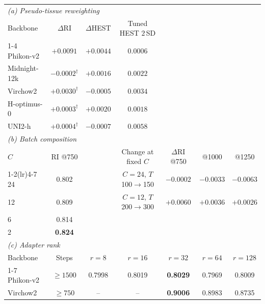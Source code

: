 \begin{tabular}{lcccccc}
\toprule
\multicolumn{7}{l}{\emph{(a) Pseudo-tissue reweighting}} \\
Backbone & $\Delta$RI & $\Delta$HEST & Tuned HEST $2$\,SD & & & \\
\cmidrule(lr){1-4}
Phikon-v2    & $+0.0091$          & $+0.0044$ & $0.0006$ & & & \\
Midnight-12k & $-0.0002^\dagger$  & $+0.0016$ & $0.0022$ & & & \\
Virchow2     & $+0.0030^\dagger$  & $-0.0005$ & $0.0034$ & & & \\
H-optimus-0  & $+0.0003^\dagger$  & $+0.0020$ & $0.0018$ & & & \\
UNI2-h       & $+0.0004^\dagger$  & $-0.0007$ & $0.0058$ & & & \\
\midrule
\multicolumn{7}{l}{\emph{(b) Batch composition}} \\
$C$ & RI @750 & & Change at fixed $C$ & $\Delta$RI @750 & @1000 & @1250 \\
\cmidrule(lr){1-2}\cmidrule(lr){4-7}
24 & 0.802          & & $C{=}24$, $T$ 100$\to$150 & $-0.0002$ & $-0.0033$ & $-0.0063$ \\
12 & 0.809          & & $C{=}12$, $T$ 200$\to$300 & $+0.0060$ & $+0.0036$ & $+0.0026$ \\
6  & 0.814          & & & & & \\
2  & \textbf{0.824} & & & & & \\
\midrule
\multicolumn{7}{l}{\emph{(c) Adapter rank}} \\
Backbone & Steps & $r{=}8$ & $r{=}16$ & $r{=}32$ & $r{=}64$ & $r{=}128$ \\
\cmidrule(lr){1-7}
Phikon-v2 & $\ge1500$ & 0.7998 & 0.8019 & \textbf{0.8029} & 0.7969 & 0.8009 \\
Virchow2  & $\ge750$  & --     & --     & \textbf{0.9006} & 0.8983 & 0.8735 \\
\bottomrule
\end{tabular}
